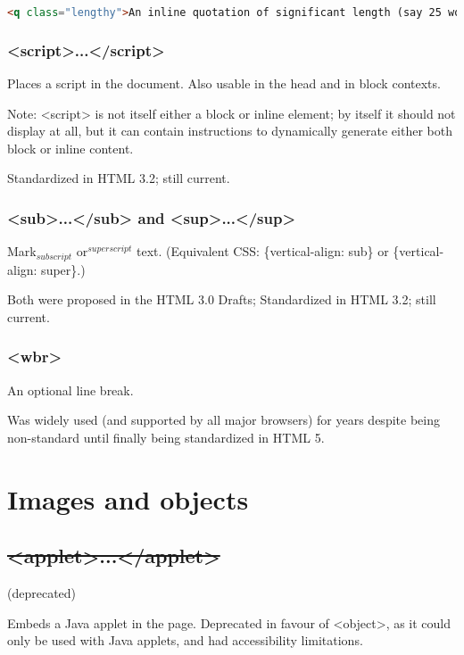 \begin{lstlisting}[language=HTML]
<q class="lengthy">An inline quotation of significant length (say 25 words, for example) goes here...</q>
\end{lstlisting}


\subsubsection{<script>...</script>}

Places a script in the document. Also usable in the head and in block contexts.

Note: <script> is not itself either a block or inline element; by itself it should not display at all, but it can contain instructions to dynamically generate either both block or inline content.

Standardized in HTML 3.2; still current.


\subsubsection{<sub>...</sub> and <sup>...</sup>}

Mark${}_{subscript}$ or${}^{superscript}$ text. (Equivalent CSS: \{vertical-align: sub\} or \{vertical-align: super\}.)

Both were proposed in the HTML 3.0 Drafts; Standardized in HTML 3.2; still current.


\subsubsection{<wbr>}

An optional line break.

Was widely used (and supported by all major browsers) for years despite being non-standard until finally being standardized in HTML 5.


\section{Images and objects}


\subsection{\sout{<applet>...</applet>}}

(deprecated)

Embeds a Java applet in the page. Deprecated in favour of <object>, as it could only be used with Java applets, and had accessibility limitations.


